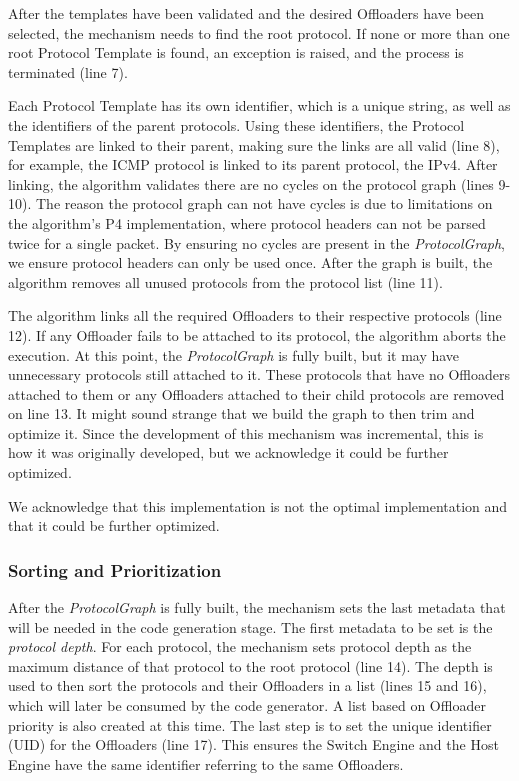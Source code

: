 After the templates have been validated and the desired Offloaders have been selected, the mechanism needs to find the root protocol. If none or more than one root Protocol Template is found, an exception is raised, and the process is terminated (line 7).

Each Protocol Template has its own identifier, which is a unique string, as well as the identifiers of the parent protocols. Using these identifiers, the Protocol Templates are linked to their parent, making sure the links are all valid (line 8), for example, the ICMP protocol is linked to its parent protocol, the IPv4. After linking, the algorithm validates there are no cycles on the protocol graph (lines 9-10). The reason the protocol graph can not have cycles is due to limitations on the algorithm's P4 implementation, where protocol headers can not be parsed twice for a single packet. By ensuring no cycles are present in the \textit{ProtocolGraph}, we ensure protocol headers can only be used once. After the graph is built, the algorithm removes all unused protocols from the protocol list (line 11).

The algorithm links all the required Offloaders to their respective protocols (line 12). If any Offloader fails to be attached to its protocol, the algorithm aborts the execution. At this point, the \textit{ProtocolGraph} is fully built, but it may have unnecessary protocols still attached to it. These protocols that have no Offloaders attached to them or any Offloaders attached to their child protocols are removed on line 13. It might sound strange that we build the graph to then trim and optimize it. Since the development of this mechanism was incremental, this is how it was originally developed, but we acknowledge it could be further optimized.

We acknowledge that this implementation is not the optimal implementation and that it could be further optimized.

\subsubsection*{Sorting and Prioritization}

After the \textit{ProtocolGraph} is fully built, the mechanism sets the last metadata that will be needed in the code generation stage. The first metadata to be set is the \textit{protocol depth}. For each protocol, the mechanism sets protocol depth as the maximum distance of that protocol to the root protocol (line 14). The depth is used to then sort the protocols and their Offloaders in a list (lines 15 and 16), which will later be consumed by the code generator. A list based on Offloader priority is also created at this time. The last step is to set the unique identifier (UID) for the Offloaders (line 17). This ensures the Switch Engine and the Host Engine have the same identifier referring to the same Offloaders.

